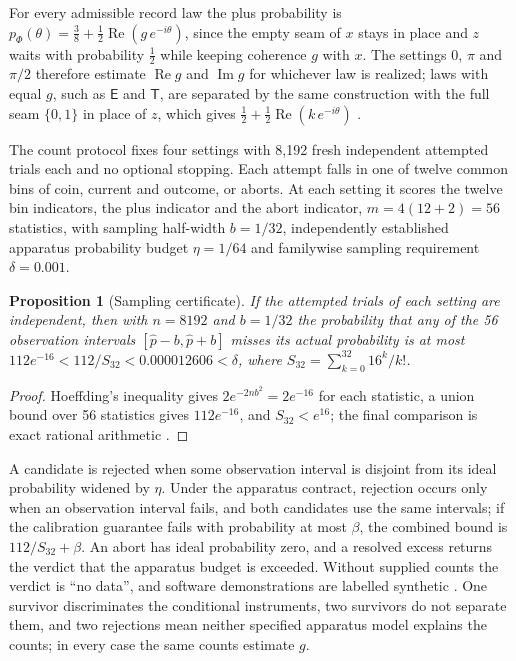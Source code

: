 \documentclass[11pt]{article}
\newtheorem{proposition}[theorem]{Proposition}
\theoremstyle{definition}
\theoremstyle{remark}
\theoremstyle{plain}
\newcommand{\En}{\mathsf{E}}
\newcommand{\Tn}{\mathsf{T}}
\begin{document}
For every admissible record law the plus probability is
$p_\Phi(\theta)=\tfrac38+\tfrac12\operatorname{Re}(g\,e^{-i\theta})$, since the
empty seam of $x$ stays in place and $z$ waits with probability $\frac12$
while keeping coherence $g$ with $x$. The settings $0$, $\pi$ and $\pi/2$
therefore estimate $\operatorname{Re}g$ and $\operatorname{Im}g$ for whichever
law is realized; laws with equal $g$, such as $\En$ and $\Tn$, are separated
by the same construction with the full seam $\{0,1\}$ in place of $z$, which
gives $\frac12+\frac12\operatorname{Re}(k\,e^{-i\theta})$ \cite{mRECORDLAWS}.

The count protocol fixes four settings with 8,192 fresh independent attempted
trials each and no optional stopping. Each attempt falls in one of twelve
common bins of coin, current and outcome, or aborts. At each setting it
scores the twelve bin indicators, the plus indicator and the abort indicator,
$m=4(12+2)=56$ statistics, with sampling half-width $b=1/32$, independently
established apparatus probability budget $\eta=1/64$ and familywise sampling
requirement $\delta=0.001$.

\begin{proposition}[Sampling certificate]
\label{prop:sampling}
If the attempted trials of each setting are independent, then with $n=8192$
and $b=1/32$ the probability that any of the 56 observation intervals
$[\hat p-b,\hat p+b]$ misses its actual probability is at most
$112e^{-16}<112/S_{32}<0.000012606<\delta$, where
$S_{32}=\sum_{k=0}^{32}16^k/k!$.
\end{proposition}

\begin{proof}
Hoeffding's inequality \cite{hoeffding1963} gives
$2e^{-2nb^2}=2e^{-16}$ for each statistic, a union bound over 56 statistics
gives $112e^{-16}$, and $S_{32}<e^{16}$; the final comparison is exact
rational arithmetic \cite{prDERIV}.
\end{proof}

A candidate is rejected when some observation interval is disjoint from its
ideal probability widened by $\eta$. Under the apparatus contract, rejection
occurs only when an observation interval fails, and both candidates use the
same intervals; if the calibration guarantee fails with probability at most
$\beta$, the combined bound is $112/S_{32}+\beta$. An abort has ideal
probability zero, and a resolved excess returns the verdict that the
apparatus budget is exceeded. Without supplied counts the verdict is ``no
data'', and software demonstrations are labelled synthetic \cite{prREADME}.
One survivor discriminates the conditional instruments, two survivors do
not separate them, and two rejections mean neither specified apparatus model
explains the counts; in every case the same counts estimate $g$.
\end{document}
